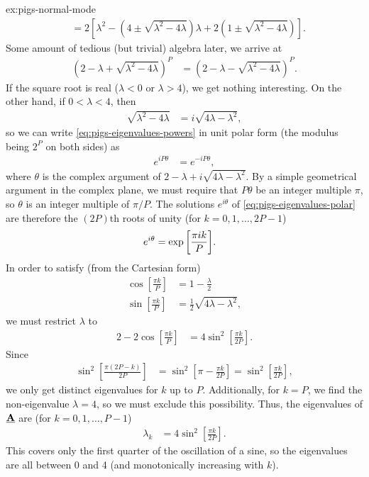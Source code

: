 \begin{DefAnswer}{ex:pigs-normal-mode}
\begin{align}
		&= 2 \left[ \lambda^2 - \left( 4 \pm \sqrt{\lambda^2 - 4 \lambda} \right) \lambda + 2 \left( 1 \pm \sqrt{\lambda^2 - 4 \lambda} \right) \right].
	\end{align}
	Some amount of tedious (but trivial) algebra later, we arrive at
	\begin{align}
		\left( 2 - \lambda + \sqrt{\lambda^2 - 4 \lambda} \right)^P
		&= \left( 2 - \lambda - \sqrt{\lambda^2 - 4 \lambda} \right)^P.
			\label{eq:pigs-eigenvalues-powers}
	\end{align}
	If the square root is real ($\lambda < 0$ or $\lambda > 4$), we get nothing interesting.
	On the other hand, if $0 < \lambda < 4$, then
	\begin{align}
		\sqrt{\lambda^2 - 4 \lambda}
		&= i \sqrt{4 \lambda - \lambda^2},
	\end{align}
	so we can write \cref{eq:pigs-eigenvalues-powers} in unit polar form (the modulus being $2^P$ on both sides) as
	\begin{align}
		e^{i P \theta}
		&= e^{-i P \theta},
			\label{eq:pigs-eigenvalues-polar}
	\end{align}
	where $\theta$ is the complex argument of $2 - \lambda + i \sqrt{4 \lambda - \lambda^2}$.
	By a simple geometrical argument in the complex plane, we must require that $P \theta$ be an integer multiple $\pi$, so $\theta$ is an integer multiple of $\pi / P$.
	The solutions $e^{i \theta}$ of \cref{eq:pigs-eigenvalues-polar} are therefore the $(2 P)$th roots of unity (for $k = 0, 1, \ldots, 2 P - 1$)
	\begin{align}
		e^{i \theta}
		&= \exp{\left[ \frac{\pi i k}{P} \right]}.
	\end{align}
	In order to satisfy (from the Cartesian form)
	\begin{subequations}
	\begin{align}
		\cos{\left[ \frac{\pi k}{P} \right]}
		&= 1 - \frac{\lambda}{2} \\
		\sin{\left[ \frac{\pi k}{P} \right]}
		&= \frac{1}{2} \sqrt{4 \lambda - \lambda^2},
	\end{align}
	\end{subequations}
	we must restrict $\lambda$ to
	\begin{align}
		2 - 2 \cos{\left[ \frac{\pi k}{P} \right]}
		&= 4 \sin^2{\left[ \frac{\pi k}{2 P} \right]}.
	\end{align}
	Since
	\begin{align}
		\sin^2{\left[ \frac{\pi (2 P - k)}{2 P} \right]}
		&= \sin^2{\left[ \pi - \frac{\pi k}{2 P} \right]}
		= \sin^2{\left[ \frac{\pi k}{2 P} \right]},
	\end{align}
	we only get distinct eigenvalues for $k$ up to $P$.
	Additionally, for $k = P$, we find the non-eigenvalue $\lambda = 4$, so we must exclude this possibility.
	Thus, the eigenvalues of $\underline{\bm{\mathbf{A}}}$ are (for $k = 0, 1, \ldots, P - 1$)
	\begin{align}
		\lambda_k
		&= 4 \sin^2{\left[ \frac{\pi k}{2 P} \right]}.
	\end{align}
	This covers only the first quarter of the oscillation of a sine, so the eigenvalues are all between 0 and 4 (and monotonically increasing with $k$).


\end{DefAnswer}
